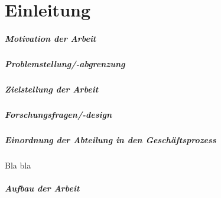 \acresetall 
\chapter{Einleitung}
\paragraph{Motivation der Arbeit}

\paragraph{Problemstellung/-abgrenzung}

\paragraph{Zielstellung der Arbeit}

\paragraph{Forschungsfragen/-design}

\paragraph{Einordnung der Abteilung in den Geschäftsprozess}
Bla bla

\paragraph{Aufbau der Arbeit}

